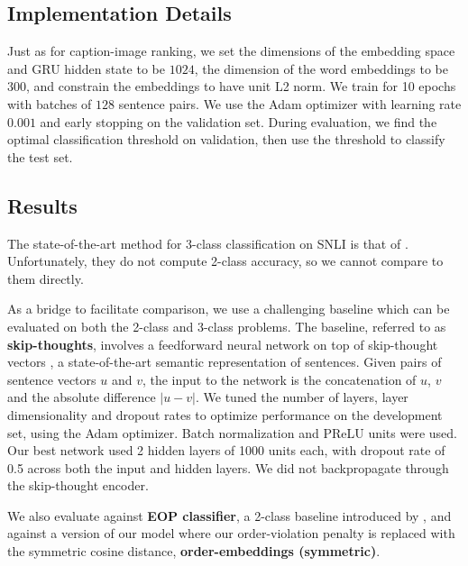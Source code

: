 \documentclass{article} \usepackage{iclr2016_conference,times}
\begin{document}
\vspace{-0.5mm}
\subsection{Implementation Details}
Just as for caption-image ranking, we set the dimensions of the embedding space and GRU hidden state to be $1024$, the dimension of the word embeddings to be $300$, and constrain the embeddings to have unit L2 norm. We train for 10 epochs with batches of $128$ sentence pairs. We use the Adam optimizer with learning rate $0.001$ and early stopping on the validation set. 
During evaluation, we find the optimal classification threshold on validation, then use the threshold to classify the test set.

\vspace{-1mm}
\subsection{Results}
The state-of-the-art method for 3-class classification on SNLI is that of \citet{rocktaschel2015reasoning}. Unfortunately, they do not compute 2-class accuracy, so we cannot compare to them directly.

As a bridge to facilitate comparison, we use a challenging baseline which can be evaluated on both the 2-class and 3-class problems. The baseline, referred to as \textbf{skip-thoughts},  involves a feedforward neural network on top of skip-thought vectors \citep{kiros2015skip}, a state-of-the-art semantic representation of sentences. Given pairs of sentence vectors $u$ and $v$, the input to the network is the concatenation of $u$, $v$ and the absolute difference $|u-v|$. We tuned the number of layers, layer dimensionality and dropout rates to optimize performance on the development set, using the Adam optimizer. Batch normalization \citep{ioffe2015batch} and PReLU units \citep{he2015delving} were used. Our best network used 2 hidden layers of 1000 units each, with dropout rate of 0.5 across both the input and hidden layers. We did not backpropagate through the skip-thought encoder.

We also evaluate against \textbf{EOP classifier}, a 2-class baseline introduced by \citep{snli}, and against a version of our model where our order-violation penalty is replaced with the symmetric cosine distance, \textbf{order-embeddings (symmetric)}.
\end{document}
